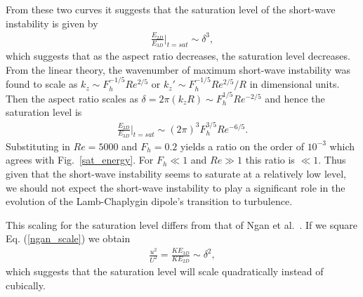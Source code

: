 From these two curves it suggests that the saturation level of the short-wave instability is given by
\begin{align}
\frac{E_{2D}}{E_{3D}}\bigg|_{t=sat} \sim \delta^{3},
\end{align}
which suggests that as the aspect ratio decreases, the saturation level decreases. From the linear theory, the wavenumber of maximum short-wave instability was found to scale as $k_{z}\sim F_{h}^{-1/5}Re^{2/5}$ or $k_{z}'\sim F_{h}^{-1/5}Re^{2/5}/R$ in dimensional units. Then the aspect ratio scales as $\delta = 2\pi(k_{z}R) \sim F_{h}^{1/5}Re^{-2/5}$ and hence the saturation level is 
\begin{align}
\frac{E_{2D}}{E_{3D}}\bigg|_{t=sat} \sim (2\pi)^{3}F_{h}^{3/5}Re^{-6/5}.
\end{align}
Substituting in $Re=5000$ and $F_{h}=0.2$ yields a ratio on the order of $10^{-3}$ which agrees with Fig.~\ref{sat_energy}. For $F_{h}\ll 1$ and $Re\gg 1$ this ratio is $\ll 1$. Thus given that the short-wave instability seems to saturate at a relatively low level, we should not expect the short-wave instability to play a significant role in the evolution of the Lamb-Chaplygin dipole's transition to turbulence. 

This scaling for the saturation level differs from that of Ngan et al.\ \cite{ngan2005}. If we square Eq. (\ref{ngan_scale}) we obtain 
\begin{align}
\frac{u^{2}}{U^{2}} =\frac{KE_{3D}}{KE_{2D}}\sim \delta^{2},
\end{align}
which suggests that the saturation level will scale quadratically instead of cubically. %


